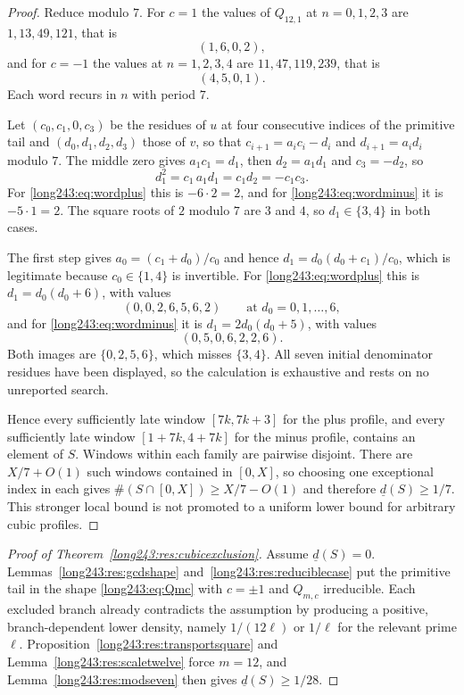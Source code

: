 \documentclass[11pt]{article}
\begin{document}
\begin{proof}
Reduce modulo $7$.  For $c=1$ the values of $Q_{12,1}$ at $n=0,1,2,3$ are
$1,13,49,121$, that is
\begin{equation}\label{long243:eq:wordplus}
 (1,6,0,2),
\end{equation}
and for $c=-1$ the values at $n=1,2,3,4$ are $11,47,119,239$, that is
\begin{equation}\label{long243:eq:wordminus}
 (4,5,0,1).
\end{equation}
Each word recurs in $n$ with period $7$.

Let $(c_0,c_1,0,c_3)$ be the residues of $u$ at four consecutive indices of the
primitive tail and $(d_0,d_1,d_2,d_3)$ those of $v$, so that
$c_{i+1}=a_ic_i-d_i$ and $d_{i+1}=a_id_i$ modulo $7$.  The middle zero gives
$a_1c_1=d_1$, then $d_2=a_1d_1$ and $c_3=-d_2$, so
\begin{equation}\label{long243:eq:d1square}
 d_1^2=c_1\,a_1d_1=c_1d_2=-c_1c_3 .
\end{equation}
For \eqref{long243:eq:wordplus} this is $-6\cdot2=2$, and for \eqref{long243:eq:wordminus} it
is $-5\cdot1=2$.  The square roots of $2$ modulo $7$ are $3$ and $4$, so
$d_1\in\{3,4\}$ in both cases.

The first step gives $a_0=(c_1+d_0)/c_0$ and hence
$d_1=d_0(d_0+c_1)/c_0$, which is legitimate because $c_0\in\{1,4\}$ is
invertible.  For \eqref{long243:eq:wordplus} this is $d_1=d_0(d_0+6)$, with values
\[
 (0,0,2,6,5,6,2) \qquad\text{at } d_0=0,1,\ldots,6,
\]
and for \eqref{long243:eq:wordminus} it is $d_1=2d_0(d_0+5)$, with values
\[
 (0,5,0,6,2,2,6).
\]
Both images are $\{0,2,5,6\}$, which misses $\{3,4\}$.  All seven initial
denominator residues have been displayed, so the calculation is exhaustive and
rests on no unreported search.

Hence every sufficiently late window $[7k,7k+3]$ for the plus profile,
and every sufficiently late window $[1+7k,4+7k]$ for the minus profile,
contains an element of $S$. Windows within each family are pairwise disjoint.
There are $X/7+O(1)$ such windows contained in $[0,X]$, so choosing one
exceptional index in each gives $\#(S\cap[0,X])\ge X/7-O(1)$ and therefore
$\underline d(S)\ge1/7$. This stronger local bound is not promoted to a
uniform lower bound for arbitrary cubic profiles.
\end{proof}

\begin{proof}[Proof of Theorem~\ref{long243:res:cubicexclusion}]
Assume $\underline d(S)=0$.  Lemmas~\ref{long243:res:gcdshape}
and~\ref{long243:res:reduciblecase} put the primitive tail in the shape \eqref{long243:eq:Qmc}
with $c=\pm1$ and $Q_{m,c}$ irreducible.  Each excluded branch already
contradicts the assumption by producing a positive, branch-dependent lower
density, namely $1/(12\ell)$ or $1/\ell$ for the relevant prime $\ell$.
Proposition~\ref{long243:res:transportsquare} and Lemma~\ref{long243:res:scaletwelve} force
$m=12$, and Lemma~\ref{long243:res:modseven} then gives $\underline d(S)\ge1/28$.
\end{proof}
\end{document}
